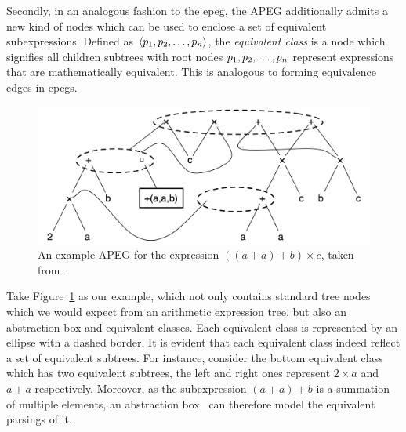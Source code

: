 Secondly, in an analogous fashion to the \gls{epeg}, the APEG additionally
admits a new kind of nodes which can be used to enclose a set of equivalent
subexpressions.  Defined as $\langle p_1, p_2, \mathellipsis, p_n \rangle$,
the \emph{equivalent class} is a node which signifies all children subtrees
with root nodes $p_1, p_2, \mathellipsis, p_n$ represent expressions that are
mathematically equivalent.  This is analogous to forming equivalence edges in
\glspl{epeg}.

\begin{figure}[ht]
    \centering
    \includegraphics[scale=0.4]{bg/fig/apeg.png}
    \caption{%
        An example APEG for the expression $\left( \left( a + a \right) + b
        \right) \times c$, taken from~\cite{martel12}.
    }\label{bg:fig:apeg}
\end{figure}
Take Figure~\ref{bg:fig:apeg} as our example, which not only contains standard
tree nodes which we would expect from an arithmetic expression tree, but
also an abstraction box and equivalent classes.  Each equivalent class is
represented by an ellipse with a dashed border.  It is evident that each
equivalent class indeed reflect a set of equivalent subtrees.  For instance,
consider the bottom equivalent class which has two equivalent subtrees, the
left and right ones represent $2 \times a$ and $a + a$ respectively.  Moreover,
as the subexpression $(a + a) + b$ is a summation of multiple elements, an
abstraction box \, can therefore model the equivalent
parsings of it.

